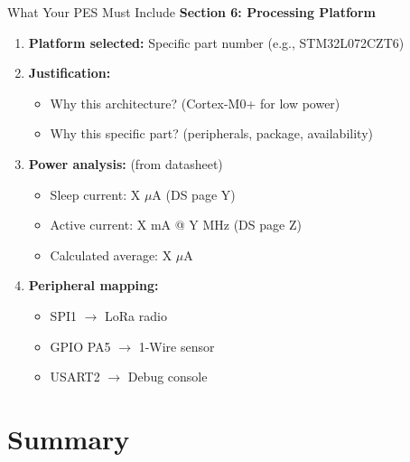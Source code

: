 \documentclass[aspectratio=169,11pt]{beamer}
\begin{document}
\begin{frame}{What Your PES Must Include}
    \textbf{Section 6: Processing Platform}
    
    \vspace{0.3cm}
    \begin{enumerate}
        \item \textbf{Platform selected:} Specific part number (e.g., STM32L072CZT6)
        
        \item \textbf{Justification:}
        \begin{itemize}
            \item Why this architecture? (Cortex-M0+ for low power)
            \item Why this specific part? (peripherals, package, availability)
        \end{itemize}
        
        \item \textbf{Power analysis:} (from datasheet)
        \begin{itemize}
            \item Sleep current: X $\mu$A (DS page Y)
            \item Active current: X mA @ Y MHz (DS page Z)
            \item Calculated average: X $\mu$A
        \end{itemize}
        
        \item \textbf{Peripheral mapping:}
        \begin{itemize}
            \item SPI1 $\rightarrow$ LoRa radio
            \item GPIO PA5 $\rightarrow$ 1-Wire sensor
            \item USART2 $\rightarrow$ Debug console
        \end{itemize}
    \end{enumerate}
\end{frame}

\section{Summary}
\end{document}
